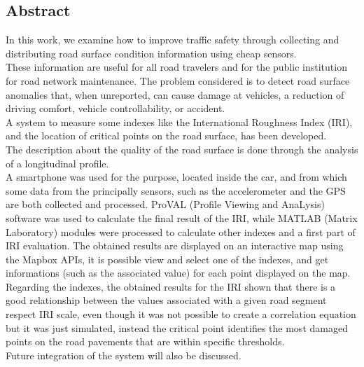 \documentclass[tesi]{subfiles}
\begin{document}
\begin{flushright}
\section*{Abstract}\label{Abstract}

\vspace{10mm}
\end{flushright}
\noindent In this work, we examine how to improve traffic safety through collecting and distributing road surface condition information using cheap sensors.\\ These information are useful for all road travelers and for the public institution for road network maintenance.
The problem considered is to detect road surface anomalies that, when unreported, can cause damage at vehicles, a reduction of driving comfort, vehicle controllability, or accident.\\A system to measure some indexes like the International Roughness Index (IRI), and the location of critical points on the road surface, has been developed. \\ The description about the quality of the road surface is done through the analysis of a longitudinal profile.\\A smartphone was used for the purpose, located inside the car, and from which some data from the principally sensors, such as the accelerometer and the GPS are both collected and processed. ProVAL (Profile Viewing and AnaLysis) software was used to calculate the final result of the IRI, while MATLAB (Matrix Laboratory) modules were processed to calculate other indexes and a first part of IRI evaluation. The obtained results are displayed on an interactive map using the Mapbox APIs, it is possible view and select one of the indexes, and get informations (such as the associated value) for each point displayed on the map.\\Regarding the indexes, the obtained results for the IRI shown that there is a good relationship between the values associated with a given road segment respect IRI scale, even though it was not possible to create a correlation equation but it was just simulated, instead the critical point identifies the most damaged points on the road pavements that are within specific thresholds.\\Future integration of the system will also be discussed.
\clearpage
\end{document}
